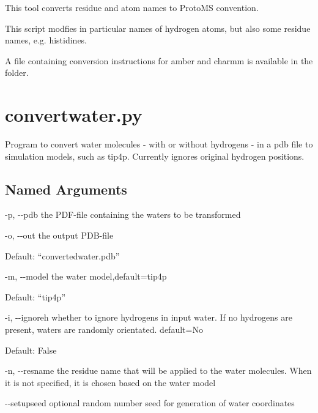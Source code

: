 \documentclass[letterpaper,10pt,english]{sphinxmanual}
\begin{document}

This tool converts residue and atom names to ProtoMS convention.

This script modfies in particular names of hydrogen atoms, but also some residue names, e.g. histidines.

A file containing conversion instructions for amber and charmm is available in the  folder.


\section{convertwater.py}
\label{\detokenize{tools:convertwater-py}}

Program to convert water molecules - with or without hydrogens - in a pdb file to simulation models, such as tip4p. Currently ignores original hydrogen positions.


%
\begin{sphinxVerbatim}[commandchars=\\\{\}]
  \PYG{p}{[}\PYG{p}{]} \PYG{p}{[} \PYG{p}{]} \PYG{p}{[} \PYG{p}{]} \PYG{p}{[} \PYG{p}{]} \PYG{p}{[}\PYG{p}{]} \PYG{p}{[} \PYG{p}{]}
                       \PYG{p}{[} \PYG{p}{]}
\end{sphinxVerbatim}


\subsection{Named Arguments}
\label{\detokenize{tools:Named Arguments}}\begin{optionlist}{3cm}
\item [-p, -{-}pdb]  
the PDF-file containing the waters to be transformed
\item [-o, -{-}out]  
the output PDB-file

Default: “convertedwater.pdb”
\item [-m, -{-}model]  
the water model,default=tip4p

Default: “tip4p”
\item [-i, -{-}ignoreh]  
whether to ignore hydrogens in input water. If no hydrogens are present, waters are randomly orientated. default=No

Default: False
\item [-n, -{-}resname]  
the residue name that will be applied to the water molecules. When it is not specified, it is chosen based on the water model
\item [-{-}setupseed]  
optional random number seed for generation of water coordinates
\end{optionlist}
\end{document}
